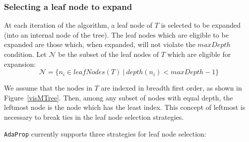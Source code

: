 \documentclass[a4paper,12pt]{article} %
\newcommand{\AdaProp}{\texttt{AdaProp}\xspace}
\newcommand{\mcl}[1]{\mathcal{#1}}
\begin{document}
\subsubsection{Selecting a leaf node to expand}
\label{secTreeBuild}

At each iteration of the algorithm, 
    a leaf node of $T$ is selected to be expanded 
    (into an internal node of the tree).
The leaf nodes which are eligible to be expanded
    are those which, when expanded, will not 
    violate the $maxDepth$ condition.
Let $\mcl{N}$ be the subset of the leaf nodes of $T$ 
    which are eligible for expansion:
    $$ \mcl{N} = \{ n_i \in leafNodes(T) ~\big|~ depth(n_i) < maxDepth - 1 \} $$

We assume that the nodes in $T$ are indexed in breadth first order, 
    as shown in Figure~\ref{visMTree}.
Then, among any subset of nodes with equal depth,
    the leftmost node is the node which has the least index.
This concept of leftmost is necessary to break ties in the 
    leaf node selection strategies.    
    
\AdaProp currently supports three strategies for leaf node selection:
\end{document}
